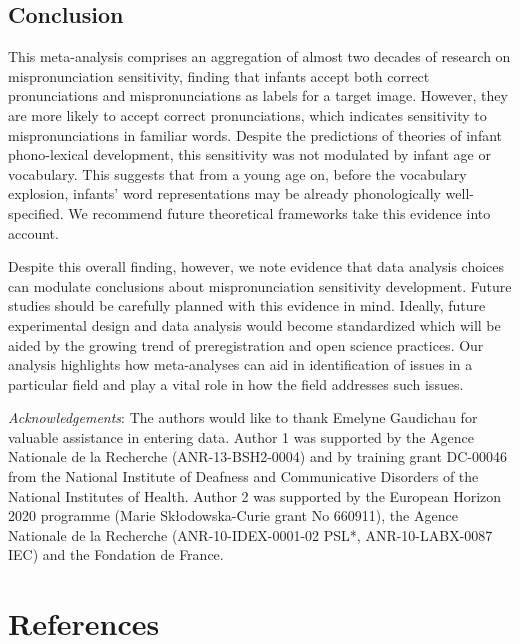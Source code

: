 \documentclass[man]{apa6}
\theoremstyle{definition}
\theoremstyle{definition}
\theoremstyle{definition}
\theoremstyle{remark}
\begin{document}
\subsection{Conclusion}\label{conclusion}

This meta-analysis comprises an aggregation of almost two decades of
research on mispronunciation sensitivity, finding that infants accept
both correct pronunciations and mispronunciations as labels for a target
image. However, they are more likely to accept correct pronunciations,
which indicates sensitivity to mispronunciations in familiar words.
Despite the predictions of theories of infant phono-lexical development,
this sensitivity was not modulated by infant age or vocabulary. This
suggests that from a young age on, before the vocabulary explosion,
infants' word representations may be already phonologically
well-specified. We recommend future theoretical frameworks take this
evidence into account.

Despite this overall finding, however, we note evidence that data
analysis choices can modulate conclusions about mispronunciation
sensitivity development. Future studies should be carefully planned with
this evidence in mind. Ideally, future experimental design and data
analysis would become standardized which will be aided by the growing
trend of preregistration and open science practices. Our analysis
highlights how meta-analyses can aid in identification of issues in a
particular field and play a vital role in how the field addresses such
issues.

\newpage

\emph{Acknowledgements}: The authors would like to thank Emelyne
Gaudichau for valuable assistance in entering data. Author 1 was
supported by the Agence Nationale de la Recherche (ANR-13-BSH2-0004) and
by training grant DC-00046 from the National Institute of Deafness and
Communicative Disorders of the National Institutes of Health. Author 2
was supported by the European Horizon 2020 programme (Marie
Skłodowska-Curie grant No 660911), the Agence Nationale de la Recherche
(ANR-10-IDEX-0001-02 PSL*, ANR-10-LABX-0087 IEC) and the Fondation de
France.

\newpage

\section{References}\label{references}

\begingroup
\setlength{\parindent}{-0.5in} \setlength{\leftskip}{0.5in}
\end{document}
